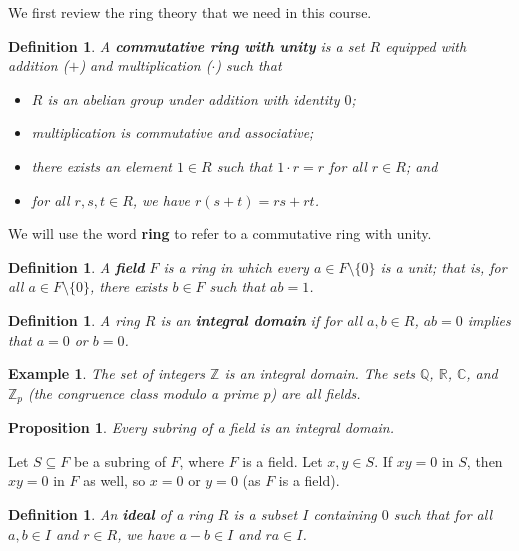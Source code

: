 \documentclass[10pt]{article}
\makeatletter
\newcommand{\R}{\mathbb{R}}
\newcommand{\C}{\mathbb{C}}
\newcommand{\Z}{\mathbb{Z}}
\newcommand{\Q}{\mathbb{Q}}
\theoremstyle{newstyle}
\newtheorem{prop}[thm]{Proposition}
\newtheorem{defn}[thm]{Definition}
\newtheorem{exmp}[thm]{Example}
\newenvironment{pf}[1][\proofname]{\par
  \pushQED{\qed}%
  \normalfont \topsep0\p@\relax
  \trivlist
  \item[\hskip\labelsep\scshape
  #1\@addpunct{.}]\ignorespaces
}{%
  \popQED\endtrivlist\@endpefalse
}
\makeatother
\begin{document}
We first review the ring theory that we need in this course. 

\begin{defn}
A {\bf commutative ring with unity} is a set $R$ equipped with addition ($+$) and 
multiplication ($\cdot$) such that
\begin{itemize}
    \item $R$ is an abelian group under addition with identity $0$;
    \item multiplication is commutative and associative;
    \item there exists an element $1 \in R$ such that $1 \cdot r = r$ for all $r \in R$; and 
    \item for all $r, s, t \in R$, we have $r(s+t) = rs+rt$.
\end{itemize}
\end{defn}

We will use the word {\bf ring} to refer to a commutative ring with unity. 

\begin{defn}
A {\bf field} $F$ is a ring in which every $a \in F \setminus \{0\}$ is a unit; 
that is, for all $a \in F \setminus \{0\}$, there exists $b \in F$ such that $ab = 1$. 
\end{defn}

\begin{defn}
A ring $R$ is an {\bf integral domain} if for all $a, b \in R$, $ab = 0$ implies that 
$a = 0$ or $b = 0$. 
\end{defn}

\begin{exmp}
The set of integers $\Z$ is an integral domain. The sets $\Q$, $\R$, $\C$, and $\Z_p$ 
(the congruence class modulo a prime $p$) are all fields.
\end{exmp}

\begin{prop}
Every subring of a field is an integral domain.
\end{prop}
\begin{pf}
Let $S \subseteq F$ be a subring of $F$, where $F$ is a field. Let $x, y \in S$. If $xy = 0$ 
in $S$, then $xy = 0$ in $F$ as well, so $x = 0$ or $y = 0$ (as $F$ is a field).
\end{pf}

\begin{defn}
An {\bf ideal} of a ring $R$ is a subset $I$ containing $0$ such that for all $a, b \in I$ and 
$r \in R$, we have $a - b \in I$ and $ra \in I$.
\end{defn}
\end{document}
